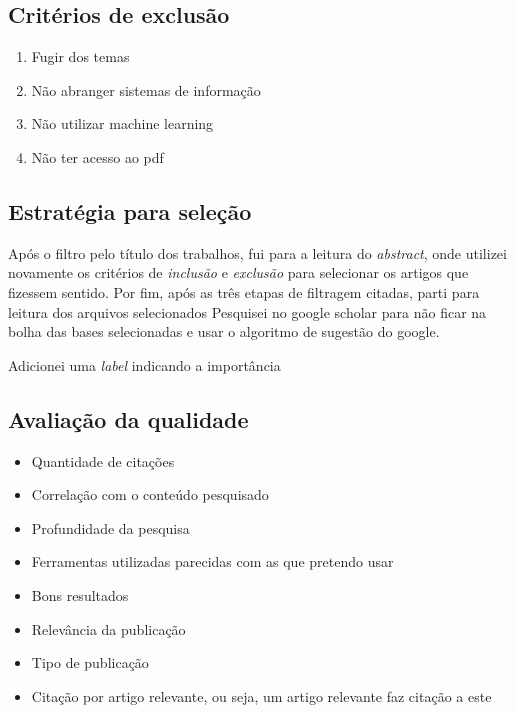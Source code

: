 \documentclass[conference]{IEEEtran}
\begin{document}
\subsection{Critérios de exclusão}
\label{cap:crit_exclusao}
\begin{enumerate}
    \item Fugir dos temas
    \item Não abranger sistemas de informação
    \item Não utilizar machine learning
    \item Não ter acesso ao pdf 
\end{enumerate}

\subsection{Estratégia para seleção}
Após o filtro pelo título dos trabalhos, fui para a leitura do \emph{abstract}, onde utilizei novamente os critérios de \emph{inclusão} e \emph{exclusão} para selecionar os artigos que fizessem sentido. Por fim, após as três etapas de filtragem citadas, parti para leitura dos arquivos selecionados
Pesquisei no google scholar para não ficar na bolha das bases selecionadas e usar o algoritmo de sugestão do google.

Adicionei uma \emph{label} indicando a importância 

\subsection{Avaliação da qualidade}
\begin{itemize}
    \item Quantidade de citações
    \item Correlação com o conteúdo pesquisado
    \item Profundidade da pesquisa
    \item Ferramentas utilizadas parecidas com as que pretendo usar
    \item Bons resultados
    \item Relevância da publicação
    \item Tipo de publicação
    \item Citação por artigo relevante, ou seja, um artigo relevante faz citação a este
\end{itemize}
\end{document}
